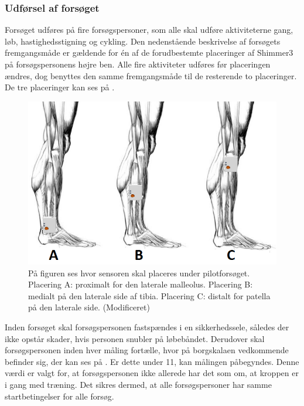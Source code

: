 \subsubsection{Udførsel af forsøget}
Forsøget udføres på fire forsøgspersoner, som alle skal udføre aktiviteterne gang, løb, hastighedsstigning og cykling. Den nedenstående beskrivelse af forsøgets fremgangsmåde er gældende for én af de forudbestemte placeringer af Shimmer3 på forsøgspersonens højre ben. Alle fire aktiviteter udføres før placeringen ændres, dog benyttes den samme fremgangsmåde til de resterende to placeringer. De tre placeringer kan ses på .
\begin{figure}[H]
	\centering
	\includegraphics[scale=0.55]{figures/qBilag/Sensor_placering2.png}
	\caption{På figuren ses hvor sensoren skal placeres under pilotforsøget. Placering A: proximalt for den laterale malleolus. Placering B: medialt på den laterale side af tibia. Placering C: distalt for patella på den laterale side. \citep{Perna2016,Shimmer2016} (Modificeret)}
	\label{fig:sensor_placering}
\end{figure}
Inden forsøget skal forsøgspersonen fastspændes i en sikkerhedssele, således der ikke opstår skader, hvis personen snubler på løbebåndet. Derudover skal forsøgspersonen inden hver måling fortælle, hvor på borgskalaen vedkommende befinder sig, der kan ses på . Er dette under 11, kan målingen påbegyndes. Denne værdi er valgt for, at forsøgspersonen ikke allerede har det som om, at kroppen er i gang med træning. Det sikres dermed, at alle forsøgspersoner har samme startbetingelser for alle forsøg. %
